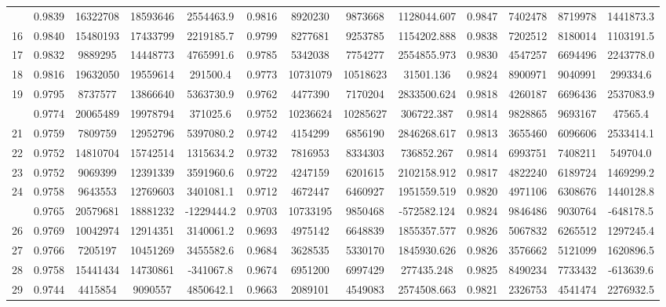 \documentclass[
  12pt,
]{article}
\begin{document}
\begin{longtable}[t]{lcccccccccccc}
\addlinespace
15 & 0.9839 & 16322708 & 18593646 & 2554463.9 & 0.9816 & 8920230 & 9873668 & 1128044.607 & 0.9847 & 7402478 & 8719978 & 1441873.3\\
16 & 0.9840 & 15480193 & 17433799 & 2219185.7 & 0.9799 & 8277681 & 9253785 & 1154202.888 & 0.9838 & 7202512 & 8180014 & 1103191.5\\
17 & 0.9832 & 9889295 & 14448773 & 4765991.6 & 0.9785 & 5342038 & 7754277 & 2554855.973 & 0.9830 & 4547257 & 6694496 & 2243778.0\\
18 & 0.9816 & 19632050 & 19559614 & 291500.4 & 0.9773 & 10731079 & 10518623 & 31501.136 & 0.9824 & 8900971 & 9040991 & 299334.6\\
19 & 0.9795 & 8737577 & 13866640 & 5363730.9 & 0.9762 & 4477390 & 7170204 & 2833500.624 & 0.9818 & 4260187 & 6696436 & 2537083.9\\
\addlinespace
20 & 0.9774 & 20065489 & 19978794 & 371025.6 & 0.9752 & 10236624 & 10285627 & 306722.387 & 0.9814 & 9828865 & 9693167 & 47565.4\\
21 & 0.9759 & 7809759 & 12952796 & 5397080.2 & 0.9742 & 4154299 & 6856190 & 2846268.617 & 0.9813 & 3655460 & 6096606 & 2533414.1\\
22 & 0.9752 & 14810704 & 15742514 & 1315634.2 & 0.9732 & 7816953 & 8334303 & 736852.267 & 0.9814 & 6993751 & 7408211 & 549704.0\\
23 & 0.9752 & 9069399 & 12391339 & 3591960.6 & 0.9722 & 4247159 & 6201615 & 2102158.912 & 0.9817 & 4822240 & 6189724 & 1469299.2\\
24 & 0.9758 & 9643553 & 12769603 & 3401081.1 & 0.9712 & 4672447 & 6460927 & 1951559.519 & 0.9820 & 4971106 & 6308676 & 1440128.8\\
\addlinespace
25 & 0.9765 & 20579681 & 18881232 & -1229444.2 & 0.9703 & 10733195 & 9850468 & -572582.124 & 0.9824 & 9846486 & 9030764 & -648178.5\\
26 & 0.9769 & 10042974 & 12914351 & 3140061.2 & 0.9693 & 4975142 & 6648839 & 1855357.577 & 0.9826 & 5067832 & 6265512 & 1297245.4\\
27 & 0.9766 & 7205197 & 10451269 & 3455582.6 & 0.9684 & 3628535 & 5330170 & 1845930.626 & 0.9826 & 3576662 & 5121099 & 1620896.5\\
28 & 0.9758 & 15441434 & 14730861 & -341067.8 & 0.9674 & 6951200 & 6997429 & 277435.248 & 0.9825 & 8490234 & 7733432 & -613639.6\\
29 & 0.9744 & 4415854 & 9090557 & 4850642.1 & 0.9663 & 2089101 & 4549083 & 2574508.663 & 0.9821 & 2326753 & 4541474 & 2276932.5\\

\end{longtable}
\end{document}
